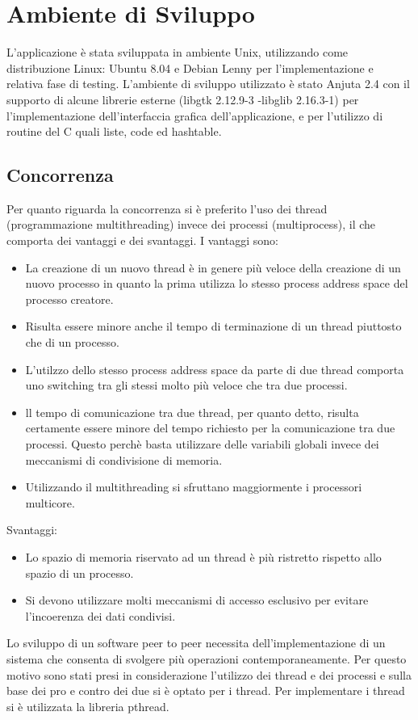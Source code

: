 \chapter{Ambiente di Sviluppo}
L'applicazione è stata sviluppata in ambiente Unix, utilizzando come distribuzione Linux: Ubuntu 8.04 e Debian Lenny per l'implementazione e relativa fase di testing.
L'ambiente di sviluppo utilizzato è stato Anjuta 2.4 con il supporto di alcune librerie esterne (libgtk 2.12.9-3 -libglib 2.16.3-1) per l'implementazione dell'interfaccia grafica dell'applicazione, e per l'utilizzo di routine del C quali liste, code ed hashtable.
\section{Concorrenza}
Per quanto riguarda la concorrenza si è preferito l'uso dei thread (programmazione multithreading) invece dei processi (multiprocess), il che comporta dei vantaggi e dei svantaggi. I vantaggi sono: 
\begin{itemize}
\item La creazione di un nuovo thread è in genere più veloce della creazione di un nuovo processo in quanto la prima utilizza lo stesso process address space del processo creatore. 
\item Risulta essere minore anche il tempo di terminazione di un thread piuttosto che di un processo. 
\item L'utilzzo dello stesso process address space da parte di due thread comporta uno switching tra gli stessi molto più veloce che tra due processi. 
\item ll tempo di comunicazione tra due thread, per quanto detto, risulta certamente essere minore del tempo richiesto per la comunicazione tra due processi. Questo perchè basta utilizzare delle variabili globali invece dei meccanismi di condivisione di memoria.
\item Utilizzando il multithreading si sfruttano maggiormente i processori multicore.
\end{itemize}
Svantaggi:
\begin{itemize}
\item Lo spazio di memoria riservato ad un thread è più ristretto rispetto allo spazio di un processo.
\item Si devono utilizzare molti meccanismi di accesso esclusivo per evitare l'incoerenza dei dati condivisi.
\end{itemize}
Lo sviluppo di un software peer to peer necessita dell’implementazione di un sistema che consenta di svolgere più operazioni contemporaneamente. Per questo motivo sono stati presi in considerazione l’utilizzo dei thread e dei processi e sulla base dei pro e contro dei due si è optato per i thread. Per implementare i thread si è utilizzata la libreria pthread.
